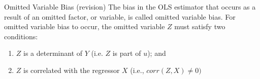 \documentclass[notes,10pt, aspectratio=169]{beamer}
\begin{document}
\begin{frame}{Omitted Variable Bias (revision)}
The bias in the OLS estimator that occurs as a result of an omitted factor, or variable, is called omitted variable bias. For omitted variable bias to occur, the omitted variable $Z$ must satisfy two conditions:
\begin{enumerate}
    \item $Z$ is a determinant of $Y$ (i.e. $Z$ is part of $u$); and
    \item $Z$ is correlated with the regressor $X$ (i.e., $corr(Z,X)\neq 0)$
\end{enumerate}

\begin{center}
\begin{figure}
\end{figure}
\end{center}
\end{frame}
\end{document}

